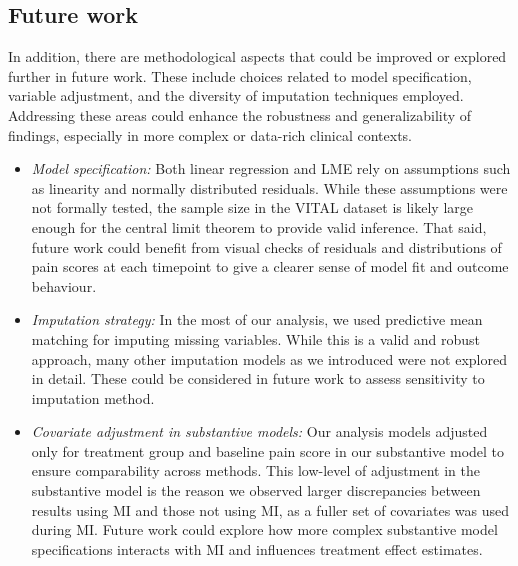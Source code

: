 \documentclass{article}
\begin{document}
\subsection{Future work}\label{future-work}

In addition, there are methodological aspects that could be improved or
explored further in future work. These include choices related to model
specification, variable adjustment, and the diversity of imputation
techniques employed. Addressing these areas could enhance the robustness
and generalizability of findings, especially in more complex or
data-rich clinical contexts.

\begin{itemize}
\item
  \emph{Model specification:} Both linear regression and LME rely on
  assumptions such as linearity and normally distributed residuals.
  While these assumptions were not formally tested, the sample size in
  the VITAL dataset is likely large enough for the central limit theorem
  to provide valid inference. That said, future work could benefit from
  visual checks of residuals and distributions of pain scores at each
  timepoint to give a clearer sense of model fit and outcome behaviour.
\item
  \emph{Imputation strategy:} In the most of our analysis, we used
  predictive mean matching for imputing missing variables. While this is
  a valid and robust approach, many other imputation models as we
  introduced were not explored in detail. These could be considered in
  future work to assess sensitivity to imputation method.
\item
  \emph{Covariate adjustment in substantive models:} Our analysis models
  adjusted only for treatment group and baseline pain score in our
  substantive model to ensure comparability across methods. This
  low-level of adjustment in the substantive model is the reason we
  observed larger discrepancies between results using MI and those not
  using MI, as a fuller set of covariates was used during MI. Future
  work could explore how more complex substantive model specifications
  interacts with MI and influences treatment effect estimates.
\end{itemize}
\end{document}
